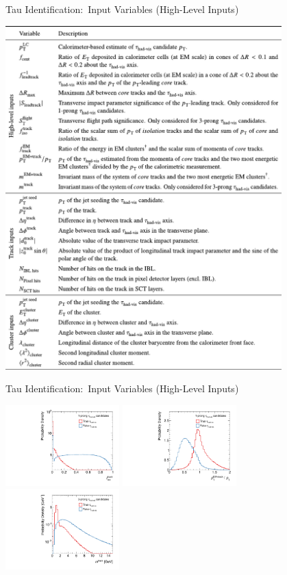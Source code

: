 \documentclass[11pt, xcolor={dvipsnames}, aspectratio=169, notes]{beamer}
\begin{document}

\begin{frame}{Tau Identification:\ Input Variables (High-Level Inputs)}
  \centering

  \includegraphics[width=0.8\textwidth, trim=0 3.7in 0 0,
  clip]{backup/tauid_variable_table}
\end{frame}


\begin{frame}{Tau Identification:\ Input Variables (High-Level Inputs)}
  \centering

  \includegraphics[width=0.33\textwidth]{tauid/invars/invars_sumpttrkfrac_1P}%
  \includegraphics[width=0.33\textwidth]{tauid/invars/invars_ptratioeflowapprox_1P}%
  \includegraphics[width=0.33\textwidth]{tauid/invars/invars_masstrksys_3P}
\end{frame}
\end{document}
